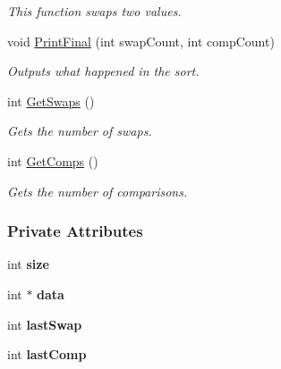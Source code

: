\begin{DoxyCompactItemize}
\begin{DoxyCompactList}\small\item\em This function swaps two values. \end{DoxyCompactList}\item 
void \hyperlink{class_bubble_sort_aba01d24e089d0c62ee4c5330111fba51}{Print\+Final} (int swap\+Count, int comp\+Count)
\begin{DoxyCompactList}\small\item\em Outputs what happened in the sort. \end{DoxyCompactList}\item 
int \hyperlink{class_bubble_sort_a658a2524f0458a555582a1a90c9c818c}{Get\+Swaps} ()
\begin{DoxyCompactList}\small\item\em Gets the number of swaps. \end{DoxyCompactList}\item 
int \hyperlink{class_bubble_sort_a30a3ee2f5fb68b3a590b17b2e6335bb5}{Get\+Comps} ()
\begin{DoxyCompactList}\small\item\em Gets the number of comparisons. \end{DoxyCompactList}\end{DoxyCompactItemize}
\subsubsection*{Private Attributes}
\begin{DoxyCompactItemize}
\item 
int {\bfseries size}\hypertarget{class_bubble_sort_acab4068c45ea7ac3d254d8a5b32361fc}{}\label{class_bubble_sort_acab4068c45ea7ac3d254d8a5b32361fc}

\item 
int $\ast$ {\bfseries data}\hypertarget{class_bubble_sort_a4c9792e8b21772ffefc6c2d77cf31f10}{}\label{class_bubble_sort_a4c9792e8b21772ffefc6c2d77cf31f10}

\item 
int {\bfseries last\+Swap}\hypertarget{class_bubble_sort_ae8d8fffbaea2ec82aeb29c5eb8042fd4}{}\label{class_bubble_sort_ae8d8fffbaea2ec82aeb29c5eb8042fd4}

\item 
int {\bfseries last\+Comp}\hypertarget{class_bubble_sort_a86b38db37c18497a9c18377135995550}{}\label{class_bubble_sort_a86b38db37c18497a9c18377135995550}

\end{DoxyCompactItemize}


